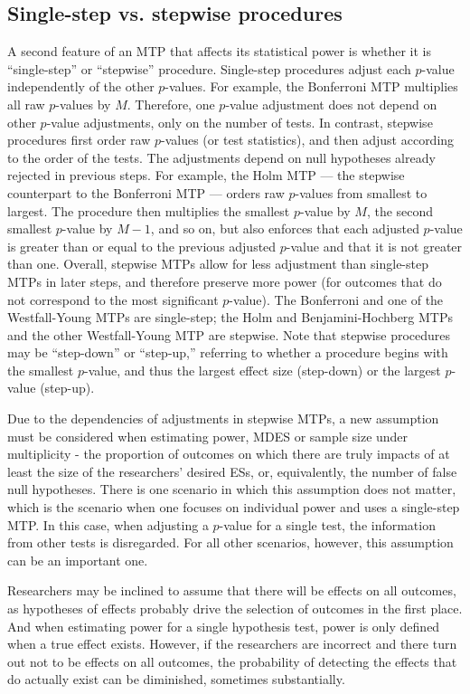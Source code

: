 \documentclass[
]{article}
\begin{document}
\subsection{Single-step vs. stepwise procedures}
\label{sec:stepwise}

A second feature of an MTP that affects its statistical power is whether
it is ``single-step'' or ``stepwise'' procedure. Single-step procedures
adjust each \(p\)-value independently of the other \(p\)-values. For
example, the Bonferroni MTP multiplies all raw \(p\)-values by \(M\).
Therefore, one \(p\)-value adjustment does not depend on other
\(p\)-value adjustments, only on the number of tests. In contrast,
stepwise procedures first order raw \(p\)-values (or test statistics),
and then adjust according to the order of the tests. The adjustments
depend on null hypotheses already rejected in previous steps. For
example, the Holm MTP --- the stepwise counterpart to the Bonferroni MTP
--- orders raw \(p\)-values from smallest to largest. The procedure then
multiplies the smallest \(p\)-value by \(M\), the second smallest
\(p\)-value by \(M-1\), and so on, but also enforces that each adjusted
\(p\)-value is greater than or equal to the previous adjusted
\(p\)-value and that it is not greater than one. Overall, stepwise MTPs
allow for less adjustment than single-step MTPs in later steps, and
therefore preserve more power (for outcomes that do not correspond to
the most significant \(p\)-value). The Bonferroni and one of the
Westfall-Young MTPs are single-step; the Holm and Benjamini-Hochberg
MTPs and the other Westfall-Young MTP are stepwise. Note that stepwise
procedures may be ``step-down'' or ``step-up,'' referring to whether a
procedure begins with the smallest \(p\)-value, and thus the largest
effect size (step-down) or the largest \(p\)-value (step-up).

Due to the dependencies of adjustments in stepwise MTPs, a new
assumption must be considered when estimating power, MDES or sample size
under multiplicity - the proportion of outcomes on which there are truly
impacts of at least the size of the researchers' desired ESs, or,
equivalently, the number of false null hypotheses. There is one scenario
in which this assumption does not matter, which is the scenario when one
focuses on individual power and uses a single-step MTP. In this case,
when adjusting a \(p\)-value for a single test, the information from
other tests is disregarded. For all other scenarios, however, this
assumption can be an important one.

Researchers may be inclined to assume that there will be effects on all
outcomes, as hypotheses of effects probably drive the selection of
outcomes in the first place. And when estimating power for a single
hypothesis test, power is only defined when a true effect exists.
However, if the researchers are incorrect and there turn out not to be
effects on all outcomes, the probability of detecting the effects that
do actually exist can be diminished, sometimes substantially.
\end{document}
